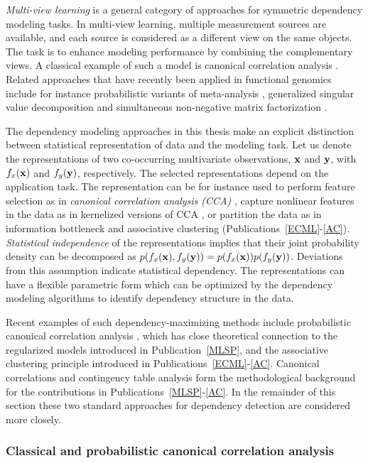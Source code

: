{\it Multi-view learning} is a general category of approaches for
symmetric dependency modeling tasks. In multi-view learning, multiple
measurement sources are available, and each source is considered as a
different view on the same objects. The task is to enhance modeling
performance by combining the complementary views. A classical example
of such a model is canonical correlation analysis
\citep{Hotelling36}. Related approaches that have recently been applied
in functional genomics include for instance probabilistic variants of
meta-analysis \citep{Choi07, Conlon07}, generalized singular value
decomposition \citep[see e.g.][]{Alter03, Berger06} and simultaneous
non-negative matrix factorization \citep{Badea08}.

The dependency modeling approaches in this thesis make an explicit
distinction between statistical representation of data and the
modeling task.  Let us denote the representations of two co-occurring
multivariate observations, $\mathbf{x}$ and $\mathbf{y}$, with $f_x(\mathbf{x})$ and
$f_y(\mathbf{y})$, respectively. The selected representations depend on the
application task. The representation can be for instance used to
perform feature selection as in {\it canonical correlation analysis
(CCA)} \citet{Hotelling36}, capture nonlinear features in the data as
in kernelized versions of CCA \citep[see e.g.][]{Yamanishi03}, or
partition the data as in information bottleneck \citep{Friedman01} and
associative clustering (Publications~\ref{ECML}-\ref{AC}). {\it
Statistical independence} of the representations implies that their
joint probability density can be decomposed as \(p(f_x(\mathbf{x}), f_y(\mathbf{y})) =
p(f_x(\mathbf{x}))p(f_y(\mathbf{y}))\). Deviations from this assumption indicate
statistical dependency. The representations can have a flexible
parametric form which can be optimized by the dependency modeling
algorithms to identify dependency structure in the data.

Recent examples of such dependency-maximizing methods include
probabilistic canonical correlation analysis \citep{Bach05}, which has
close theoretical connection to the regularized models introduced in
Publication~\ref{MLSP}, and the associative clustering principle
introduced in Publications~\ref{ECML}-\ref{AC}. Canonical
correlations and contingency table analysis form the methodological
background for the contributions in Publications~\ref{MLSP}-\ref{AC}.
In the remainder of this section these two standard approaches for
dependency detection are considered more closely.

\subsubsection{Classical and probabilistic canonical correlation analysis}

